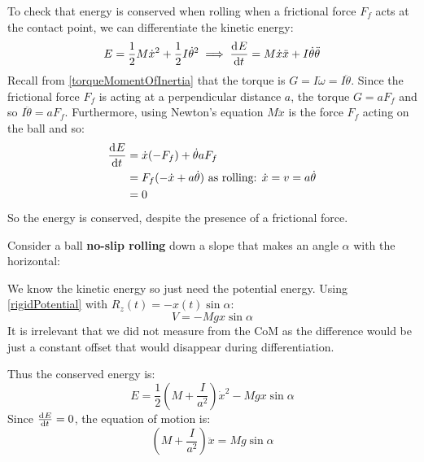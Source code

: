 \documentclass[../main.tex]{subfiles}
\begin{document}
To check that energy is conserved when rolling when a frictional force $F_f$ acts at the contact point, we can differentiate the kinetic energy:
\[
  E = \frac{1}{2}M \dot{x}^2 + \frac{1}{2} I \dot{\theta}^2 \implies \deriv{E}{t} = M \dot{x}\ddot{x} + I \dot{\theta}\ddot{\theta}
\]
Recall from \cref{torqueMomentOfInertia} that the torque is $G = I \dot{\omega} = I \ddot{\theta}$.
Since the frictional force $F_{f}$ is acting at a perpendicular distance $a$, the torque $G = aF_{f}$ and so $I \ddot{\theta} = aF_{f}$.
Furthermore, using Newton's equation $M\ddot{x}$ is the force $F_{f}$ acting on the ball and so:
\begin{align*}
  \deriv{E}{t} &= \dot{x}(-F_{f}) + \dot{\theta}aF_{f} \\
               &= F_{f}(-\dot{x} + a \dot{\theta}) \text{ as rolling: $\dot{x} = v = a \dot{\theta}$} \\
               &= 0
\end{align*}
So the energy is conserved, despite the presence of a frictional force.
\begin{example}
  Consider a ball \textbf{no-slip rolling} down a slope that makes an angle $\alpha$ with the horizontal:
  \begin{center}
  \end{center}
  We know the kinetic energy so just need the potential energy.
  Using \cref{rigidPotential} with $R_z(t) = -x(t)\sin\alpha$:
  \[
    V = -Mgx\sin\alpha
  \]
  It is irrelevant that we did not measure from the CoM as the difference would be just a constant offset that would disappear during differentiation.

  Thus the conserved energy is:
  \[
    E = \frac{1}{2} \left(M + \frac{I}{a^2}\right) \dot{x}^2 - Mgx\sin\alpha
  \]
  Since $\deriv{E}{t} = 0$, the equation of motion is:
  \[
    \left(M + \frac{I}{a^2}\right) \ddot{x} = Mg\sin\alpha
  \]
\end{example}
\end{document}

